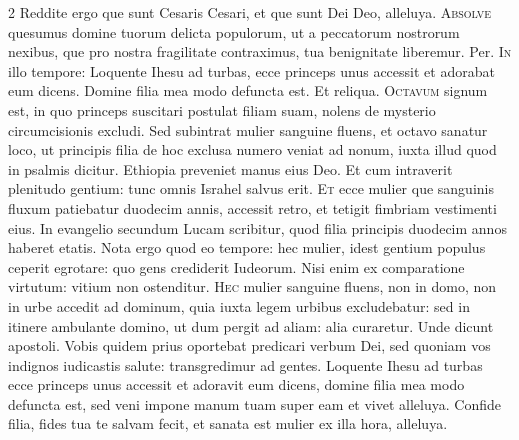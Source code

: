 \begin{multicols*}{2}
 Reddite ergo que sunt Cesaris Cesari, et que sunt Dei Deo, alleluya.
\lettrine[lines=2]{\zallmancaps \color{Blue} A}{bsolve} quesumus domine tuorum delicta populorum, ut a peccatorum nostrorum nexibus, que pro nostra fragilitate contraximus, tua benignitate liberemur. Per.
\lettrine[lines=2]{\zallmancaps \color{Red} I}{n} illo tempore: Loquente Ihesu ad turbas, ecce princeps unus accessit et adorabat eum dicens. Domine filia mea modo defuncta est. Et reliqua.
\lettrine[lines=2]{\zallmancaps \color{Blue} O}{ctavum} signum est, in quo princeps suscitari postulat filiam suam, nolens de mysterio circumcisionis excludi. Sed subintrat mulier sanguine fluens, et octavo sanatur loco, ut principis filia de hoc exclusa numero veniat ad nonum, iuxta illud quod in psalmis dicitur. Ethiopia preveniet manus eius Deo. Et cum intraverit plenitudo gentium: tunc omnis Israhel salvus erit.
\lettrine[lines=2]{\zallmancaps \color{Red} E}{t} ecce mulier que sanguinis fluxum patiebatur duodecim annis, accessit retro, et tetigit fimbriam vestimenti eius. In evangelio secundum Lucam scribitur, quod filia principis duodecim annos haberet etatis. Nota ergo quod eo tempore: hec mulier, idest gentium populus ceperit egrotare: quo gens crediderit Iudeorum. Nisi enim ex comparatione virtutum: vitium non ostenditur.
\lettrine[lines=2]{\zallmancaps \color{Blue} H}{ec} mulier sanguine fluens, non in domo, non in urbe accedit ad dominum, quia iuxta legem urbibus excludebatur: sed in itinere ambulante domino, ut dum pergit ad aliam: alia curaretur. Unde dicunt apostoli. Vobis quidem prius oportebat predicari verbum Dei, sed quoniam vos indignos iudicastis salute: transgredimur ad gentes.
 Loquente Ihesu ad turbas ecce princeps unus accessit et adoravit eum dicens, domine filia mea modo defuncta est, sed veni impone manum tuam super eam et vivet alleluya.
 Confide filia, fides tua te salvam fecit, et sanata est mulier ex illa hora, alleluya.

\end{multicols*}
